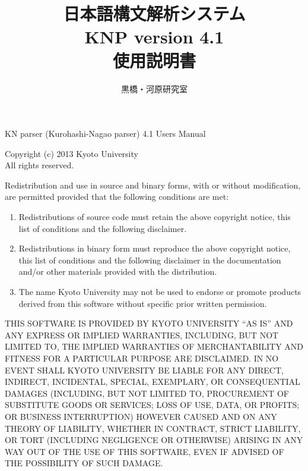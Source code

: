 \documentclass[a4j,11pt,titlepage]{jarticle}
\title{\bf 日本語構文解析システム \\
        KNP version 4.1 \\
        使用説明書}
\author{黒橋・河原研究室}
\date{平成25年12月\\
\rule{0mm}{110mm}Copyright \copyright\ 2013\begin{tabular}[t]{l}
                                京都大学大学院情報学研究科 \\
                                \end{tabular}
}
\begin{document}
\maketitle

\thispagestyle{empty}

\vspace*{\fill}

\begin{small}
\noindent
KN parser (Kurohashi-Nagao parser) 4.1 Users Manual

\noindent
Copyright (c) 2013 Kyoto University \\
All rights reserved.

\noindent
Redistribution and use in source and binary forms, with or without
modification, are permitted provided that the following conditions
are met:

\begin{enumerate}
 \item Redistributions of source code must retain the above copyright
   notice, this list of conditions and the following disclaimer.
 \item Redistributions in binary form must reproduce the above copyright
   notice, this list of conditions and the following disclaimer in the
   documentation and/or other materials provided with the distribution.
 \item The name Kyoto University may not be used to endorse or promote
   products derived from this software without specific prior written
   permission.
\end{enumerate}

\noindent
THIS SOFTWARE IS PROVIDED BY KYOTO UNIVERSITY ``AS IS'' AND ANY
EXPRESS OR IMPLIED WARRANTIES, INCLUDING, BUT NOT LIMITED TO, THE
IMPLIED WARRANTIES OF MERCHANTABILITY AND FITNESS FOR A PARTICULAR
PURPOSE ARE DISCLAIMED.  IN NO EVENT SHALL KYOTO UNIVERSITY BE
LIABLE FOR ANY DIRECT, INDIRECT, INCIDENTAL, SPECIAL, EXEMPLARY, OR
CONSEQUENTIAL DAMAGES (INCLUDING, BUT NOT LIMITED TO, PROCUREMENT OF
SUBSTITUTE GOODS OR SERVICES; LOSS OF USE, DATA, OR PROFITS; OR BUSINESS
INTERRUPTION) HOWEVER CAUSED AND ON ANY THEORY OF LIABILITY, WHETHER IN
CONTRACT, STRICT LIABILITY, OR TORT (INCLUDING NEGLIGENCE OR OTHERWISE)
ARISING IN ANY WAY OUT OF THE USE OF THIS SOFTWARE, EVEN IF ADVISED OF
THE POSSIBILITY OF SUCH DAMAGE.

\vspace{1cm}


\end{small}
\end{document}
